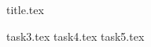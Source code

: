 \documentclass[final]{scrreprt} %
\begin{document}

{title.tex}

\newpage

\tableofcontents

\newpage
{}
{task3.tex}
{task4.tex}
{task5.tex}
\newpage
{}

\printbibliography
\end{document}
